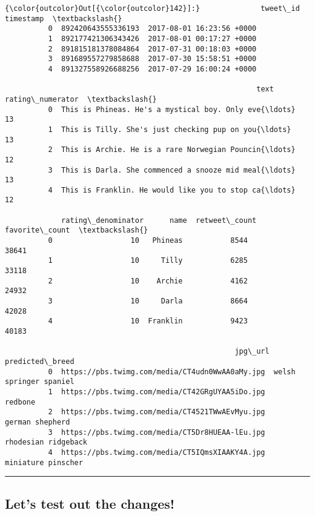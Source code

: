 \documentclass[11pt]{article}
\begin{document}
\begin{Verbatim}[commandchars=\\\{\}]
{\color{outcolor}Out[{\color{outcolor}142}]:}              tweet\_id                  timestamp  \textbackslash{}
          0  892420643555336193  2017-08-01 16:23:56 +0000   
          1  892177421306343426  2017-08-01 00:17:27 +0000   
          2  891815181378084864  2017-07-31 00:18:03 +0000   
          3  891689557279858688  2017-07-30 15:58:51 +0000   
          4  891327558926688256  2017-07-29 16:00:24 +0000   
          
                                                          text  rating\_numerator  \textbackslash{}
          0  This is Phineas. He's a mystical boy. Only eve{\ldots}                13   
          1  This is Tilly. She's just checking pup on you{\ldots}                13   
          2  This is Archie. He is a rare Norwegian Pouncin{\ldots}                12   
          3  This is Darla. She commenced a snooze mid meal{\ldots}                13   
          4  This is Franklin. He would like you to stop ca{\ldots}                12   
          
             rating\_denominator      name  retweet\_count  favorite\_count  \textbackslash{}
          0                  10   Phineas           8544           38641   
          1                  10     Tilly           6285           33118   
          2                  10    Archie           4162           24932   
          3                  10     Darla           8664           42028   
          4                  10  Franklin           9423           40183   
          
                                                     jpg\_url         predicted\_breed  
          0  https://pbs.twimg.com/media/CT4udn0WwAA0aMy.jpg  welsh springer spaniel  
          1  https://pbs.twimg.com/media/CT42GRgUYAA5iDo.jpg                 redbone  
          2  https://pbs.twimg.com/media/CT4521TWwAEvMyu.jpg         german shepherd  
          3  https://pbs.twimg.com/media/CT5Dr8HUEAA-lEu.jpg     rhodesian ridgeback  
          4  https://pbs.twimg.com/media/CT5IQmsXIAAKY4A.jpg      miniature pinscher  
\end{Verbatim}
            
    \begin{center}\rule{0.5\linewidth}{\linethickness}\end{center}

\subsection{Let's test out the
changes!}\label{lets-test-out-the-changes}
\end{document}
